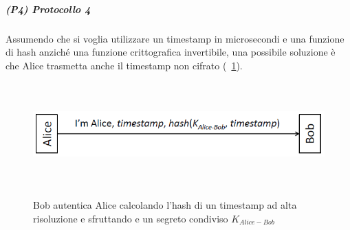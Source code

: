 \subparagraph{(P4) Protocollo 4}
Assumendo che si voglia utilizzare un timestamp in microsecondi e una funzione di hash anziché una funzione crittografica invertibile, una possibile soluzione è che Alice trasmetta anche il timestamp non cifrato (\figurename~\ref{fig:ImgS25bis}).
\begin{figure}[htbp]
	\centering%
	\subfigure%
	{\includegraphics[height=4cm, width=12cm, keepaspectratio]{Immagini/autenticazione/ImgS25bis.png}}
	\caption{Bob autentica Alice calcolando l’hash di un timestamp ad alta risoluzione e sfruttando e un segreto condiviso $K_{Alice-Bob}$\label{fig:ImgS25bis}} 	
\end{figure}
